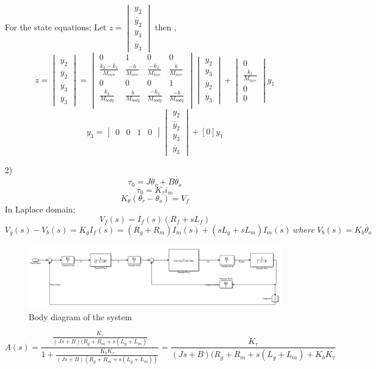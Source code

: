 \documentclass[11pt]{article}
\begin{document}
For the state equations;
Let $z = \begin{vmatrix}
y_2 \\
\dot{y_2} \\
y_3 \\
\dot{y_3}
\end{vmatrix}$ then , $$\dot{z}=\begin{vmatrix}
\dot{y_2}\\
\ddot{y_2}\\
\dot{y_3}\\
\ddot{y_3}
\end{vmatrix}=\begin{vmatrix}
0 & 1 & 0 & 0 \\
\frac{k_2-k_1}{M_{tire}} & \frac{-b}{M_{tire}} &\frac{-k_2}{M_{tire}} & \frac{b}{M_{tire}}\\
0 & 0 & 0 & 1 \\
\frac{k_2}{M_{body}} & \frac{b}{M_{body}} & \frac{-k_2}{M_{body}} & \frac{-b}{M_{body}} \\
\end{vmatrix} \begin{vmatrix}
y_2 \\
y_3 \\
\dot{y_2} \\
\dot{y_3}
\end{vmatrix} + \begin{vmatrix}
0 \\
\frac{k_1}{M_{tire}} \\
0 \\
0
\end{vmatrix}y_1$$
$$y_3=\begin{vmatrix}
0 & 0 & 1 & 0
\end{vmatrix} \begin{vmatrix}
y_2 \\
\dot{y_2} \\
y_3 \\
\dot{y_3} \end{vmatrix}+[0]y_1$$

2)
$$\tau_0 = J\ddot{\theta_o}+B\dot{\theta_o}$$
$$\tau_0 = K_{\tau}i_m$$
$$K_{\theta}(\theta_r-\theta_o)=V_f$$
In Laplace domain;
$$V_f(s)=I_f(s)(R_f+sL_f)$$
$$V_g(s)-V_b(s)=K_gI_f(s)=(R_g+R_m)I_m(s)+(sL_g+sL_m)I_m(s) \> where \> V_b(s)=K_b\dot{\theta_o}$$
\begin{figure}[H]
  \includegraphics[scale=0.60, center]{feedback}
  \caption{Body diagram of the system}
  \label{fig:zero}
\end{figure}
$$A(s)=\frac{\frac{K_{\tau}}{(Js+B)(R_g+R_m+s(L_g+L_m)}}{1+\frac{K_b K_{\tau}}{(Js+B)(R_g+R_m+s(L_g+L_m))}}=\frac{K_{\tau}}{(Js+B)(R_g+R_m+s(L_g+L_m)+K_bK_{\tau}}$$
\end{document}
